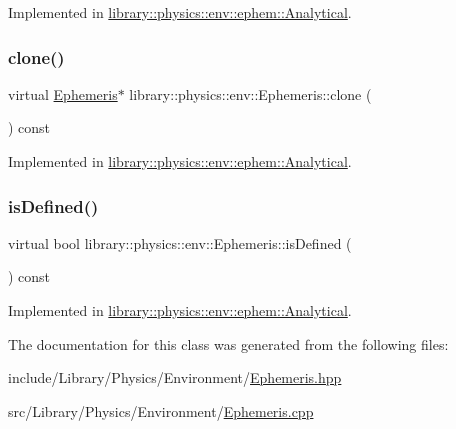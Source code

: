 Implemented in \hyperlink{classlibrary_1_1physics_1_1env_1_1ephem_1_1_analytical_a5de6a5ae0fe86c7e2ad76a3848820899}{library\+::physics\+::env\+::ephem\+::\+Analytical}.

\mbox{\label{classlibrary_1_1physics_1_1env_1_1_ephemeris_a7ddecd88d91f79ff204100eb9607b591}} 
\subsubsection{\texorpdfstring{clone()}{clone()}}
{\footnotesize\ttfamily virtual \hyperlink{classlibrary_1_1physics_1_1env_1_1_ephemeris}{Ephemeris}$\ast$ library\+::physics\+::env\+::\+Ephemeris\+::clone (\begin{DoxyParamCaption}{ }\end{DoxyParamCaption}) const\hspace{0.3cm}{\ttfamily [pure virtual]}}



Implemented in \hyperlink{classlibrary_1_1physics_1_1env_1_1ephem_1_1_analytical_acd51ca99177b1433b6623829ae003bec}{library\+::physics\+::env\+::ephem\+::\+Analytical}.

\mbox{\label{classlibrary_1_1physics_1_1env_1_1_ephemeris_abf61a03e24dd146199381db14d1d7c68}} 
\subsubsection{\texorpdfstring{is\+Defined()}{isDefined()}}
{\footnotesize\ttfamily virtual bool library\+::physics\+::env\+::\+Ephemeris\+::is\+Defined (\begin{DoxyParamCaption}{ }\end{DoxyParamCaption}) const\hspace{0.3cm}{\ttfamily [pure virtual]}}



Implemented in \hyperlink{classlibrary_1_1physics_1_1env_1_1ephem_1_1_analytical_a0c0fe5d8326ba439bb0b51e7536ab0fd}{library\+::physics\+::env\+::ephem\+::\+Analytical}.



The documentation for this class was generated from the following files\+:\begin{DoxyCompactItemize}
\item 
include/\+Library/\+Physics/\+Environment/\hyperlink{_ephemeris_8hpp}{Ephemeris.\+hpp}\item 
src/\+Library/\+Physics/\+Environment/\hyperlink{_ephemeris_8cpp}{Ephemeris.\+cpp}\end{DoxyCompactItemize}
